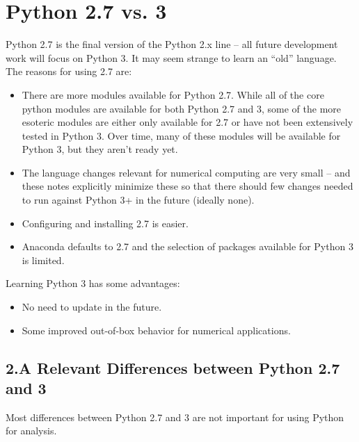 \documentclass[KSmain.tex]{subfiles}
\begin{document}
 
\section{Python 2.7 vs. 3}
Python 2.7 is the final version of the Python 2.x line – all future development work will focus on Python 3.
It may seem strange to learn an “old” language. The reasons for using 2.7 are:
\begin{itemize}
\item There are more modules available for Python 2.7. While all of the core python modules are available
for both Python 2.7 and 3, some of the more esoteric modules are either only available for 2.7 or
have not been extensively tested in Python 3. Over time, many of these modules will be available for
Python 3, but they aren’t ready yet.
\item The language changes relevant for numerical computing are very small – and these notes explicitly
minimize these so that there should few changes needed to run against Python 3+ in the future
(ideally none).
\item Configuring and installing 2.7 is easier.
\item Anaconda defaults to 2.7 and the selection of packages available for Python 3 is limited.
\end{itemize}
Learning Python 3 has some advantages:
\begin{itemize}
\item No need to update in the future.
\item Some improved out-of-box behavior for numerical applications.
\end{itemize}

\subsection{2.A Relevant Differences between Python 2.7 and 3}
Most differences between Python 2.7 and 3 are not important for using Python for analysis. 

\end{document}
